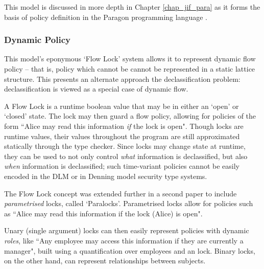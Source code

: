 This model is discussed in more depth in Chapter \ref{chap_jif_para} as it forms the basis of policy definition in the Paragon programming language \cite{broberg2013paragon}.

\subsubsection{Dynamic Policy}

This model's eponymous `Flow Lock' system allows it to represent dynamic flow policy -- that is, policy which cannot be cannot be represented in a static lattice structure. This presents an alternate approach the declassification problem: declassification is viewed as a special case of dynamic flow.

A Flow Lock is a runtime boolean value that may be in either an `open' or `closed' state. The lock may then guard a flow policy, allowing for policies of the form ``Alice may read this information \textit{if} the lock  is open". Though locks are runtime values, their values throughout the program are still approximated statically through the type checker. Since locks may change state at runtime, they can be used to not only control \textit{what} information is declassified, but also \textit{when} information is declassified; such time-variant policies cannot be easily encoded in the DLM or in Denning model security type systems.

The Flow Lock concept was extended further in a second paper \cite{broberg2010paralocks} to include \textit{parametrised} locks, called `Paralocks'. Parametrised locks allow for policies such as ``Alice may read this information if the lock (Alice) is open".

Unary (single argument) locks can then easily represent policies with dynamic \textit{roles}, like ``Any employee may access this information if they are currently a manager", built using a quantification over employees and an  lock. Binary locks, on the other hand, can represent relationships between subjects.

